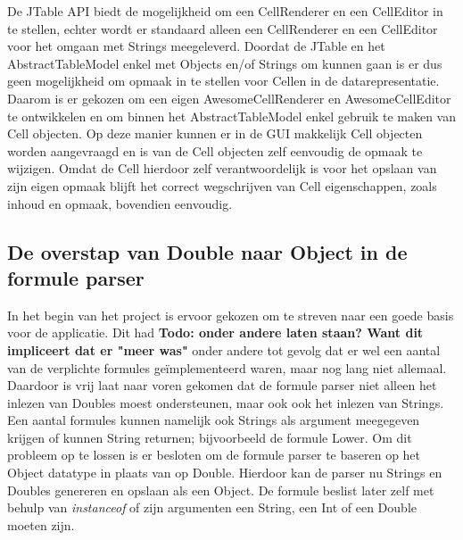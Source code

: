 \documentclass[a4paper,11pt]{article}
\begin{document}
De JTable API biedt de mogelijkheid om een CellRenderer en een CellEditor in te stellen, echter wordt er standaard alleen een CellRenderer en een CellEditor voor het omgaan met Strings meegeleverd. Doordat de JTable en het AbstractTableModel enkel met Objects en/of Strings om kunnen gaan is er dus geen mogelijkheid om opmaak in te stellen voor Cellen in de datarepresentatie.\\

Daarom is er gekozen om een eigen AwesomeCellRenderer en AwesomeCellEditor te ontwikkelen en om binnen het AbstractTableModel enkel gebruik te maken van Cell objecten. Op deze manier kunnen er in de GUI makkelijk Cell objecten worden aangevraagd en is van de Cell objecten zelf eenvoudig de opmaak te wijzigen. Omdat de Cell hierdoor zelf verantwoordelijk is voor het opslaan van zijn eigen opmaak blijft het correct wegschrijven van Cell eigenschappen, zoals inhoud en opmaak, bovendien eenvoudig.

\subsection{De overstap van Double naar Object in de formule parser}
In het begin van het project is ervoor gekozen om te streven naar een goede basis voor de applicatie. Dit had \textbf{Todo: onder andere laten staan? Want dit impliceert dat er "meer was"} onder andere tot gevolg dat er wel een aantal van de verplichte formules geïmplementeerd waren, maar nog lang niet allemaal. Daardoor is vrij laat naar voren gekomen dat de formule parser niet alleen het inlezen van Doubles moest ondersteunen, maar ook ook het inlezen van Strings. Een aantal formules kunnen namelijk ook Strings als argument meegegeven krijgen of kunnen String returnen; bijvoorbeeld de formule Lower. Om dit probleem op te lossen is er besloten om de formule parser te baseren op het Object datatype in plaats van op Double. Hierdoor kan de parser nu Strings en Doubles genereren en opslaan als een Object. De formule beslist later zelf met behulp van \textit{instanceof} of zijn argumenten een String, een Int of een Double moeten zijn.
\end{document}
